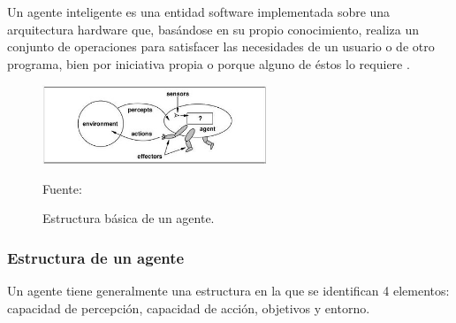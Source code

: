 Un agente inteligente es una entidad software implementada sobre una arquitectura hardware que, basándose en su propio conocimiento, realiza un conjunto de operaciones para satisfacer las necesidades de un usuario o de otro programa, bien por iniciativa propia o porque alguno de éstos lo requiere \citep{Wooldridge}.


\begin{figure}[ht]
\begin{center}
\includegraphics[width=0.6\textwidth]{Imagen2}
\end{center}
\begin{center}
\vskip -0.5cm
\caption{\small{Estructura básica de un agente.}}
{\small{Fuente: \cite{Russel}}}
\end{center}
\end{figure}


\vskip 3cm

\subsubsection{Estructura de un agente}

Un agente tiene generalmente una estructura en la que se identifican 4 elementos: capacidad de percepción, capacidad de acción, objetivos y entorno.

